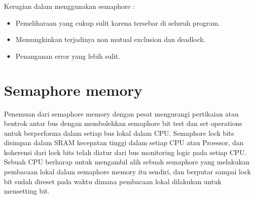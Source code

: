	Kerugian dalam menggunakan semaphore :
	
	\begin{itemize}
		\item Pemeliharaan yang cukup sulit karena tersebar di seluruh program.
		\item Memungkinkan terjadinya non  mutual exclusion dan deadlock.
		\item Penanganan error yang lebih sulit.
	\end{itemize}
\section{Semaphore memory}
\cite{earnshaw1991semaphore}Penemuan dari semaphore memory dengan pesat mengurangi pertikaian atau bentrok antar bus dengan membolehkan semaphore bit test dan set operations untuk berperforma dalam setiap bus lokal dalam CPU. Semaphore lock bits disimpan dalam SRAM kecepatan tinggi dalam setiap CPU atau Proessor, dan koherensi dari 
lock bits telah diatur dari bus monitoring logic pada setiap CPU. Sebuah CPU berharap untuk mengambil alih sebuah semaphore yang melakukan pembacaan lokal dalam semaphore memory itu sendiri, dan berputar sampai lock bit sudah direset pada waktu dimana pembacaan lokal dilakukan untuk mensetting bit.
